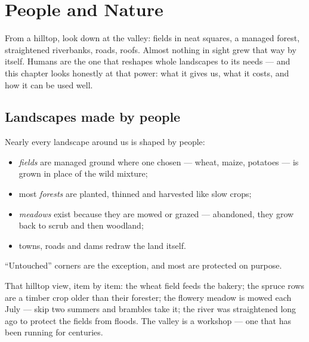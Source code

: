 \chapter{People and Nature}\label{ch:g5:people-and-nature}

From a hilltop, look down at the valley: fields in neat
squares, a managed forest, straightened riverbanks, roads,
roofs. Almost nothing in sight grew that way by itself. Humans
are the one  that reshapes whole landscapes to its
needs --- and this chapter looks honestly at that power: what
it gives us, what it costs, and how it can be used well.

\section{Landscapes made by people}

\begin{proposition}\label{prop:g5:people-and-nature:managed}
Nearly every landscape around us is shaped by people:
\begin{itemize}
  \item \emph{fields} are managed ground where one
        chosen  --- wheat, maize, potatoes --- is grown in
        place of the wild mixture;
  \item most \emph{forests} are
        planted, thinned and harvested like slow crops;
  \item \emph{meadows} exist because they are mowed or grazed
        --- abandoned, they grow back to scrub and then
        woodland;
  \item towns, roads and dams redraw the land itself.
\end{itemize}
``Untouched'' corners are the exception, and most are
protected on purpose.
\end{proposition}
\admitted

\begin{example}\label{ex:g5:people-and-nature:valley}
That hilltop view, item by item: the wheat field feeds the
bakery; the spruce rows are a timber crop older than their
forester; the flowery meadow is mowed each July --- skip two
summers and brambles take it; the river was straightened long
ago to protect the fields from floods. The valley is a
workshop --- one that has been running for centuries.
\end{example}

